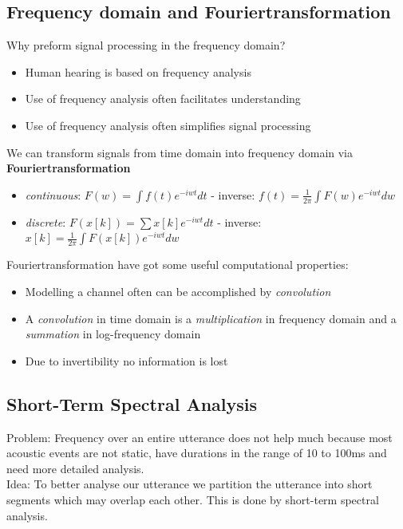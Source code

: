 \subsection{Frequency domain and Fouriertransformation}
Why preform signal processing in the frequency domain?
\begin{itemize}
\item Human hearing is based on frequency analysis
\item Use of frequency analysis often facilitates understanding
\item Use of frequency analysis often simplifies signal processing
\end{itemize}

We can transform signals from time domain into frequency domain via \textbf{Fouriertransformation} 
\begin{itemize}
\item \emph{continuous}: $F\left(w\right) = \int f\left(t\right)e^{-iwt}dt$ - inverse: $f\left(t\right) = \frac{1}{2\pi}\int F\left(w\right)e^{-iwt}dw$ 
\item \emph{discrete}: $F\left(x\left[k\right]\right) = \sum x\left[k\right]e^{-iwt}dt$ - inverse: $x\left[k\right] = \frac{1}{2\pi}\int F\left(x\left[k\right]\right)e^{-iwt}dw$ 
\end{itemize}
Fouriertransformation have got some useful computational properties:
\begin{itemize}
\item Modelling a channel often can be accomplished by \emph{convolution}
\item A \emph{convolution} in time domain is a \emph{multiplication} in frequency domain and a \emph{summation} in log-frequency domain
\item Due to invertibility no information is lost
\end{itemize}


\subsection{Short-Term Spectral Analysis}

Problem: Frequency over an entire utterance does not help much because most acoustic events are not static, have durations in the range of 10 to 100ms and need more detailed analysis.  \\

Idea: To better analyse our utterance we partition the utterance into short segments which may overlap each other. This is done by short-term spectral analysis. \\

